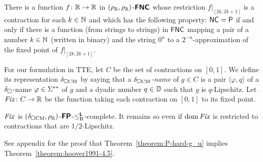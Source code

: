 \documentclass[a4paper,UKenglish]{lipics}
\begin{document}
\begin{theorem}
\label{theorem:hoover1991-4.5}
 There is a function $f \colon \mathbb R \to \mathbb R$ in $(\rho _\mathbb R, \rho _\mathbb R)$-$\text{\bfseries \sffamily \upshape FNC}$
 whose restriction $f|_{[2k, 2k+1]}$ is a contraction for each $k \in \mathbb N$ and
 which has the following property: 
 $\mathsf{NC} = \mathsf{P}$ if and only if 
 there is a function (from strings to strings) in $\mathsf{FNC}$ mapping 
 a pair of a number $k \in \mathbb N$ (written in binary) and the string $0^n$
 to a $2^{-n}$-approximation of the 
 fixed point of $f |_{[2k, 2k + 1]}$. 
\end{theorem}

For our formulation in TTE, 
let $C$ be the set of contractions on $[0, 1]$. 
We define its representation $\delta _{\square \mathrm{CM}}$ by saying that 
a \emph{$\delta _{\square \mathrm{CM}}$-name} of $g \in C$
is a pair $\langle \varphi, q \rangle$ of 
a $\delta _\square$-name $\varphi \in \Sigma ^{**}$ of $g$ 
and a dyadic number $q \in \mathbb D$ such that $g$ is $q$-Lipschitz. 
Let $\mathit{Fix} \colon C \to \mathbb R$ be the function
taking each contraction on $[0, 1]$ to its fixed point.

\begin{theorem}
\label{theorem:P-hard-g_u}
$\mathit{Fix}$ is $(\delta _{\square \mathrm{CM}}, \rho _\mathbb R)$-$\text{\bfseries \sffamily \upshape FP}$-$\leq _{\mathrm B} ^{\text{\bfseries \sffamily \upshape L}}$-complete. 
It remains so even if $\mathop{\rm dom} \mathit{Fix}$ is restricted to contractions 
that are $1/2$-Lipschitz.
\end{theorem}

See appendix for the proof that Theorem~\ref{theorem:P-hard-g_u} 
implies Theorem~\ref{theorem:hoover1991-4.5}. 

\end{document}
